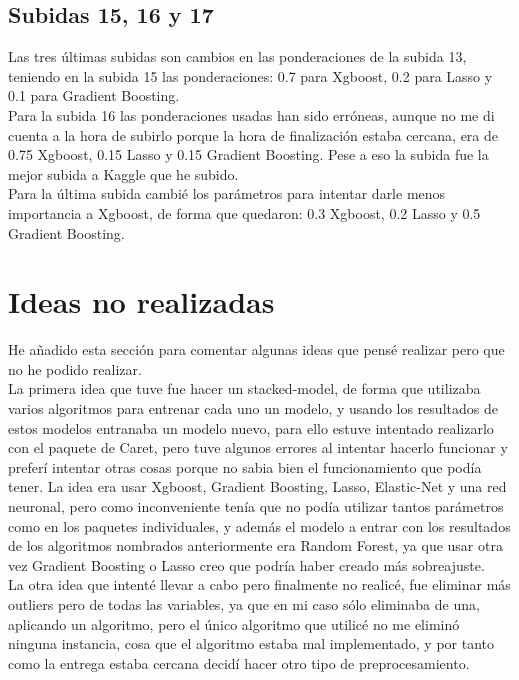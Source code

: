 \documentclass[14pt]{extarticle}
\begin{document}
\subsection{Subidas 15, 16 y 17}

Las tres últimas subidas son cambios en las ponderaciones de la subida 13, teniendo en la subida 15 las ponderaciones: 0.7 para Xgboost, 0.2 para Lasso y 0.1 para Gradient Boosting. \\

Para la subida 16 las ponderaciones usadas han sido erróneas, aunque no me di cuenta a la hora de subirlo porque la hora de finalización estaba cercana, era de 0.75 Xgboost, 0.15 Lasso y 0.15 Gradient Boosting. Pese a eso la subida fue la mejor subida a Kaggle que he subido. \\

Para la última subida cambié los parámetros para intentar darle menos importancia a Xgboost, de forma que quedaron: 0.3 Xgboost, 0.2 Lasso y 0.5 Gradient Boosting. \\


\section{Ideas no realizadas}

He añadido esta sección para comentar algunas ideas que pensé realizar pero que no he podido realizar. \\

La primera idea que tuve fue hacer un stacked-model, de forma que utilizaba varios algoritmos para entrenar cada uno un modelo, y usando los resultados de estos modelos entranaba un modelo nuevo, para ello estuve intentado realizarlo con el paquete de Caret, pero tuve algunos errores al intentar hacerlo funcionar y preferí intentar otras cosas porque no sabia bien el funcionamiento que podía tener. La idea era usar Xgboost, Gradient Boosting, Lasso, Elastic-Net y una red neuronal, pero como inconveniente tenía que no podía utilizar tantos parámetros como en los paquetes individuales, y además el modelo a entrar con los resultados de los algoritmos nombrados anteriormente era Random Forest, ya que usar otra vez Gradient Boosting o Lasso creo que podría haber creado más sobreajuste. \\

La otra idea que intenté llevar a cabo pero finalmente no realicé, fue eliminar más outliers pero de todas las variables, ya que en mi caso sólo eliminaba de una, aplicando un algoritmo, pero el único algoritmo que utilicé no me eliminó ninguna instancia, cosa que el algoritmo estaba mal implementado, y por tanto como la entrega estaba cercana decidí hacer otro tipo de preprocesamiento. \\
\end{document}
